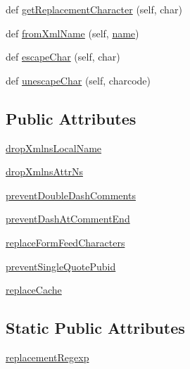 \begin{DoxyCompactItemize}
\item 
def \hyperlink{classpip_1_1__vendor_1_1html5lib_1_1__ihatexml_1_1InfosetFilter_a77ff276ded5cd967eeb566d94cf67107}{get\+Replacement\+Character} (self, char)
\item 
def \hyperlink{classpip_1_1__vendor_1_1html5lib_1_1__ihatexml_1_1InfosetFilter_a6b99c2ef0f0c0cded626c355b5667ef9}{from\+Xml\+Name} (self, \hyperlink{namespacepip_1_1__vendor_1_1html5lib_1_1__ihatexml_a23d70a7532508a399a209dff52ab42b3}{name})
\item 
def \hyperlink{classpip_1_1__vendor_1_1html5lib_1_1__ihatexml_1_1InfosetFilter_a77448e855da2d7ab940868602618c7c5}{escape\+Char} (self, char)
\item 
def \hyperlink{classpip_1_1__vendor_1_1html5lib_1_1__ihatexml_1_1InfosetFilter_ad20713f7c0f8a65664f3008307afe167}{unescape\+Char} (self, charcode)
\end{DoxyCompactItemize}
\subsection*{Public Attributes}
\begin{DoxyCompactItemize}
\item 
\hyperlink{classpip_1_1__vendor_1_1html5lib_1_1__ihatexml_1_1InfosetFilter_a8fcd839f3918332c9f3de8a8cf4b496d}{drop\+Xmlns\+Local\+Name}
\item 
\hyperlink{classpip_1_1__vendor_1_1html5lib_1_1__ihatexml_1_1InfosetFilter_a5b0f61648e4bbbd5bf8e56ae20395d68}{drop\+Xmlns\+Attr\+Ns}
\item 
\hyperlink{classpip_1_1__vendor_1_1html5lib_1_1__ihatexml_1_1InfosetFilter_a825e2cfec9d3553f0be638c083fab3e5}{prevent\+Double\+Dash\+Comments}
\item 
\hyperlink{classpip_1_1__vendor_1_1html5lib_1_1__ihatexml_1_1InfosetFilter_ac12c22b2e2eda7d27019bc5c8c31a4de}{prevent\+Dash\+At\+Comment\+End}
\item 
\hyperlink{classpip_1_1__vendor_1_1html5lib_1_1__ihatexml_1_1InfosetFilter_aa04c732db7c5f6af11173091a971bd5e}{replace\+Form\+Feed\+Characters}
\item 
\hyperlink{classpip_1_1__vendor_1_1html5lib_1_1__ihatexml_1_1InfosetFilter_a3f37c1797f7b71a12313580a21fab317}{prevent\+Single\+Quote\+Pubid}
\item 
\hyperlink{classpip_1_1__vendor_1_1html5lib_1_1__ihatexml_1_1InfosetFilter_a508c4ff416037e4be5c224d5a727a175}{replace\+Cache}
\end{DoxyCompactItemize}
\subsection*{Static Public Attributes}
\begin{DoxyCompactItemize}
\item 
\hyperlink{classpip_1_1__vendor_1_1html5lib_1_1__ihatexml_1_1InfosetFilter_a59f5b7ba1836605473a3d2a499a914c8}{replacement\+Regexp}
\end{DoxyCompactItemize}


